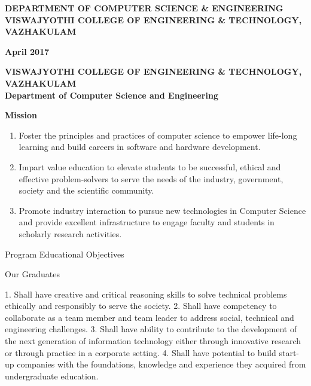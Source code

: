 \documentclass[11pt]{report}
\begin{document}
\begin{titlepage}
\begin{center}
        \vspace{0.4cm}
        
        \normalsize \textbf {DEPARTMENT OF COMPUTER SCIENCE \& ENGINEERING}\\
        \vspace{.4cm}
        \large \textbf {VISWAJYOTHI COLLEGE OF ENGINEERING \& TECHNOLOGY, VAZHAKULAM}
        
        \vspace{0.4cm}
        \normalsize \textbf{April 2017}
        
    \end{center}
\end{titlepage}

\newpage
\thispagestyle{empty}
\begin{center}
\large \textbf {VISWAJYOTHI COLLEGE OF ENGINEERING \& TECHNOLOGY, VAZHAKULAM}\\
\vspace{.4cm}
\normalsize \textbf{Department of Computer Science and Engineering}
\vspace{.6cm}

\normalsize \textbf{Mission}
\end{center}
\begin{enumerate}

\item Foster the principles and practices of computer science to empower life-long learning and build careers in software and hardware development.

\item Impart value education to elevate students to be successful, ethical and effective problem-solvers to serve the needs of the industry, government, society and the scientific community.
 
\item Promote industry interaction to pursue new technologies in Computer Science and provide excellent infrastructure to engage faculty and students in scholarly research activities.
\end{enumerate}

\begin{center}
Program Educational Objectives
\end{center}
Our Graduates 

\begin{enumerate}
1. Shall have creative and critical reasoning skills to solve technical problems ethically and responsibly to serve the society.
2. Shall have competency to collaborate as a team member and team leader to address social, technical and engineering challenges.
3. Shall have ability to contribute to the development of the next generation of information technology either through innovative research or through practice in a corporate setting.
4. Shall have potential to build start-up companies with the foundations, knowledge and experience they acquired from undergraduate education.
\end{enumerate}
\end{document}
